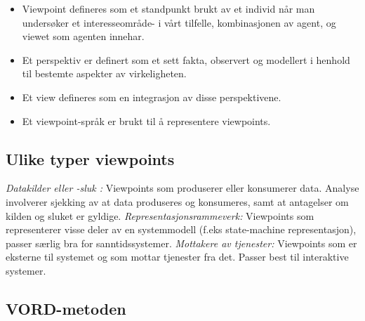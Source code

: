 \begin{itemize}
\item
  Viewpoint defineres som et standpunkt brukt av et individ når man
  undersøker et interesseområde- i vårt tilfelle, kombinasjonen av
  agent, og viewet som agenten innehar.
\item
  Et perspektiv er definert som et sett fakta, observert og modellert i
  henhold til bestemte aspekter av virkeligheten.
\item
  Et view defineres som en integrasjon av disse perspektivene.
\item
  Et viewpoint-språk er brukt til å representere viewpoints.
\end{itemize}
\subsection{Ulike typer viewpoints}

\emph{Datakilder eller -sluk :} Viewpoints som produserer eller
konsumerer data. Analyse involverer sjekking av at data produseres og
konsumeres, samt at antagelser om kilden og sluket er gyldige.
\emph{Representasjonsrammeverk:} Viewpoints som representerer visse
deler av en systemmodell (f.eks state-machine representasjon), passer
særlig bra for sanntidssystemer. \emph{Mottakere av tjenester:}
Viewpoints som er eksterne til systemet og som mottar tjenester fra det.
Passer best til interaktive systemer.

\subsection{VORD-metoden}

